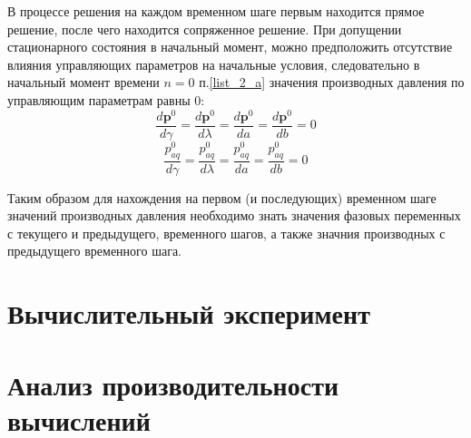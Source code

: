 \documentclass[14pt]{article}
\begin{document}
В процессе решения на каждом временном шаге первым находится прямое решение, после чего находится сопряженное решение. При допущении стационарного состояния в начальный момент, можно предположить отсутствие влияния управляющих параметров на начальные условия, следовательно в начальный момент времени $ n=0 $  п.\ref{list_2_a} значения производных давления по управляющим параметрам равны 0:
\begin{equation*}
\frac{d\boldsymbol{p}^0}{d\gamma} = \frac{d\boldsymbol{p}^0}{d\lambda} = \frac{d\boldsymbol{p}^0}{da} = \frac{d\boldsymbol{p}^0}{db} = 0
\end{equation*}
\begin{equation*}
\frac{p_{aq}^0}{d\gamma} = \frac{p_{aq}^0}{d\lambda} = \frac{p_{aq}^0}{da} = \frac{p_{aq}^0}{db} = 0
\end{equation*}

Таким образом для нахождения на первом (и последующих) временном шаге значений производных давления необходимо знать значения фазовых переменных с текущего и предыдущего, временного шагов, а также значния производных с предыдущего временного шага.

\section{Вычислительный эксперимент}

\section{Анализ производительности вычислений}

\newpage
\end{document}
